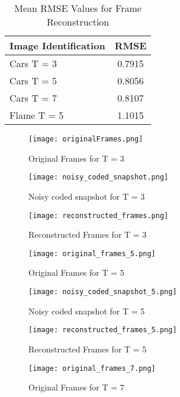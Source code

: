 \documentclass[a4paper,12pt]{article}
\begin{document}
\begin{table}[htbp]
  \centering
  \label{tab:rmse}
  \begin{tabular}{|l|c|}
    \hline
    \textbf{Image Identification} & \textbf{RMSE} \\
    \hline
    Cars T = 3 & 0.7915 \\
    Cars T = 5 & 0.8056 \\
    Cars T = 7 & 0.8107 \\
    Flame T = 5 & 1.1015 \\
    \hline
  \end{tabular}
  \caption{Mean RMSE Values for Frame Reconstruction}
\end{table}

\begin{figure}[htbp]
    \centering
    \texttt{[image: originalFrames.png]}
    \caption{Original Frames for T = 3}
\end{figure}

\begin{figure}[htbp]
    \centering
    \texttt{[image: noisy\_coded\_snapshot.png]}
    \caption{Noisy coded snapshot for T = 3}
\end{figure}

\begin{figure}[htbp]
    \centering
    \texttt{[image: reconstructed\_frames.png]}
    \caption{Reconstructed Frames for T = 3}
\end{figure}

\begin{figure}[htbp]
    \centering
    \texttt{[image: original\_frames\_5.png]}
    \caption{Original Frames for T = 5}
\end{figure}

\begin{figure}[htbp]
    \centering
    \texttt{[image: noisy\_coded\_snapshot\_5.png]}
    \caption{Noisy coded snapshot for T = 5}
\end{figure}

\begin{figure}[htbp]
    \centering
    \texttt{[image: reconstructed\_frames\_5.png]}
    \caption{Reconstructed Frames for T = 5}
\end{figure}

\begin{figure}[htbp]
    \centering
    \texttt{[image: original\_frames\_7.png]}
    \caption{Original Frames for T = 7}
\end{figure}
\end{document}

